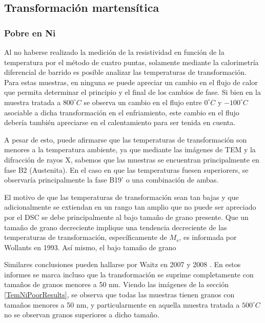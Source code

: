 \documentclass[12pt]{article}
\theoremstyle{definition}
\theoremstyle{remark}
\begin{document}
\subsection{Transformación martensítica}
\label{TransfomacionDiscusion}

\subsubsection{Pobre en Ni}
Al no haberse realizado la medición de la resistividad en función de la temperatura por el método de cuatro puntas, solamente mediante la calorimetría diferencial de barrido es posible analizar las temperaturas de transformación. Para estas muestras, en ninguna se puede apreciar un cambio en el flujo de calor que permita determinar el principio y el final de los cambios de fase. Si bien en la muestra tratada a $800^\circ C$ se observa un cambio en el flujo entre $0^\circ C$ y $-100^\circ C$ asociable a dicha transformación en el enfriamiento, este cambio en el flujo debería también apreciarse en el calentamiento para ser tenida en cuenta.

A pesar de esto, puede afirmarse que las temperaturas de transformación son menores a la temperatura ambiente, ya que mediante las imágenes de TEM y la difracción de rayos X, sabemos que las muestras se encuentran principalmente en fase B2 (Austenita). En el caso en que las temperaturas fuesen superiorers, se observaría principalmente la fase B19' o una combinación de ambas.

El motivo de que las temperaturas de transformación sean tan bajas y que adicionalmente se extiendan en un rango tan amplio que no puede ser apreciado por el DSC se debe principalmente al bajo tamaño de grano presente. Que un tamaño de grano decreciente implique una tendencia decreciente de las temperaturas de transformación, específicamente de $M_s$, es informada por Wollants en 1993\cite{Wollants1993}. Así mismo, el bajo tamaño de grano

Similares conclusiones pueden hallarse por Waitz en 2007 y 2008 \cite{Waitz2007}\cite{Waitz2008}. En estos informes se marca incluso que la transformación se suprime completamente con tamaños de granos menores a 50 nm. Viendo las imágenes de la sección \ref{TemNiPoorResults}, se observa que todas las muestras tienen granos con tamaños menores a 50 nm, y particularmente en aquella muestra tratada a $500^\circ C$ no se observan granos superiores a dicho tamaño.
\end{document}
